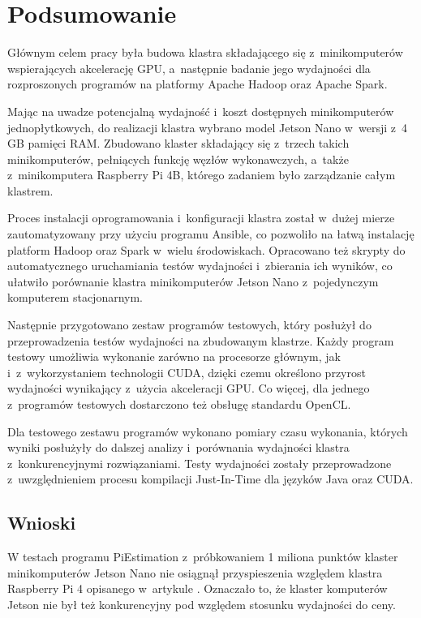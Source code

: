 \chapter{Podsumowanie} \label{ch:podsumowanie}

Głównym celem pracy była budowa klastra  składającego się z~minikomputerów
wspierających akcelerację GPU, a~następnie badanie jego wydajności dla rozproszonych programów na
platformy Apache Hadoop oraz Apache Spark.

Mając na uwadze potencjalną wydajność i~koszt dostępnych minikomputerów jednopłytkowych, do realizacji
klastra wybrano model Jetson Nano w~wersji z~4 GB pamięci RAM. Zbudowano klaster składający się z~trzech
takich minikomputerów, pełniących funkcję węzłów wykonawczych, a~także z~minikomputera Raspberry Pi
4B, którego zadaniem było zarządzanie całym klastrem.

Proces instalacji oprogramowania i~konfiguracji klastra został w~dużej mierze zautomatyzowany przy
użyciu programu Ansible, co pozwoliło na łatwą instalację platform Hadoop oraz Spark w~wielu
środowiskach. Opracowano też skrypty do automatycznego uruchamiania testów wydajności i~zbierania
ich wyników, co ułatwiło porównanie klastra minikomputerów Jetson Nano z~pojedynczym komputerem
stacjonarnym.

Następnie przygotowano zestaw programów testowych, który posłużył do przeprowadzenia testów wydajności
na zbudowanym klastrze. Każdy program testowy umożliwia wykonanie zarówno na procesorze głównym,
jak i~z~wykorzystaniem technologii CUDA, dzięki czemu określono przyrost wydajności wynikający
z~użycia akceleracji GPU. Co więcej, dla jednego z~programów testowych dostarczono też obsługę
standardu OpenCL.

Dla testowego zestawu programów wykonano pomiary czasu wykonania, których wyniki posłużyły do dalszej
analizy i~porównania wydajności klastra z~konkurencyjnymi rozwiązaniami. Testy wydajności zostały
przeprowadzone z~uwzględnieniem procesu kompilacji Just-In-Time dla języków Java oraz CUDA.
\newpage

\section{Wnioski}

W testach programu PiEstimation z~próbkowaniem 1 miliona punktów klaster minikomputerów Jetson Nano
nie osiągnął przyspieszenia względem klastra Raspberry Pi 4 opisanego w~artykule \cite{rpi-cluster-2}.
Oznaczało to, że klaster komputerów Jetson nie był też konkurencyjny pod względem stosunku wydajności
do ceny.

